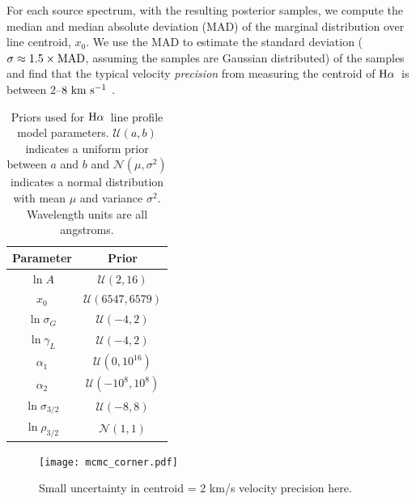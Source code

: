 \documentclass[modern, letterpaper]{aastex61}
\newcommand{\Ha}{\ensuremath{{\rm H}\alpha}}
\begin{document}
For each source spectrum, with the resulting posterior samples, we compute the
median and median absolute deviation (MAD) of the marginal distribution over
line centroid, $x_0$.
We use the MAD to estimate the standard deviation ($\sigma \approx 1.5\times{\rm
MAD}$, assuming the samples are Gaussian distributed) of the samples and find
that the typical velocity \emph{precision} from measuring the centroid of \Ha\
is between $2$--$8~\mathrm{km}~\mathrm{s}^{-1}$ .

\begin{table}[ht]
  \begin{center}
    \begin{tabular}{ c | c }
      \toprule
        Parameter & Prior \\\toprule
        $\ln A$ & $\mathcal{U}(2, 16)$\\
        $x_0$ & $\mathcal{U}(6547, 6579)$\\
        $\ln\sigma_G$ & $\mathcal{U}(-4, 2)$\\
        $\ln\gamma_L$ & $\mathcal{U}(-4, 2)$\\
        $\alpha_1$ & $\mathcal{U}(0, 10^{16})$\\
        $\alpha_2$ & $\mathcal{U}(-10^8, 10^8)$\\
        $\ln\sigma_{3/2}$ & $\mathcal{U}(-8, 8)$\\
        $\ln\rho_{3/2}$ & $\mathcal{N}(1, 1)$\\
      \bottomrule
    \end{tabular}
    \caption{
      Priors used for \Ha\ line profile model parameters.
      $\mathcal{U}(a, b)$ indicates a uniform prior between $a$ and $b$ and
      $\mathcal{N}(\mu, \sigma^2)$ indicates a normal distribution with mean
      $\mu$ and variance $\sigma^2$.
      Wavelength units are all angstroms.
      \label{tbl:prior-bounds}
    }
  \end{center}
\end{table}

\begin{figure}[htbp]
  \begin{center}
    \texttt{[image: mcmc\_corner.pdf]}
  \end{center}
  \caption{%
    Small uncertainty in centroid = 2 km/s velocity precision here.
    \label{fig:Halpha-mcmc-corner}}
\end{figure}
\end{document}
